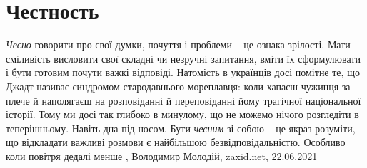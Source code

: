  
 
 
 
 
\chapter{Честность}

\emph{Чесно} говорити про свої думки, почуття і проблеми – це ознака зрілості. Мати
сміливість висловити свої складні чи незручні запитання, вміти їх сформулювати
і бути готовим почути важкі відповіді. Натомість в українців досі помітне те,
що Джадт називає синдромом стародавнього мореплавця: коли хапаєш чужинця за
плече й наполягаєш на розповіданні й переповіданні йому трагічної національної
історії.  Тому ми досі так глибоко в минулому, що не можемо нічого розгледіти в
теперішньому. Навіть дна під носом. Бути \emph{чесним} зі собою – це якраз розуміти,
що відкладати важливі розмови є найбільшою безвідповідальністю. Особливо коли
повітря дедалі менше
, 
Володимир Молодій, zaxid.net, 22.06.2021

